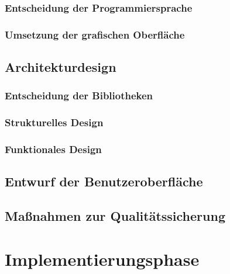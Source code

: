 \documentclass[ngerman,11pt,a4paper,titlepage]{article}
\begin{document}
	\subsubsection{Entscheidung der Programmiersprache}
	\label{subsubsec:programmiersprache}
	\programmierspracheText
	
	\subsubsection{Umsetzung der grafischen Oberfläche}
	\label{subsubsec:grafischeoberflaeche}
	\grafischeOberflaecheText
	
	\subsection{Architekturdesign}
	\label{subsec:architekturdesign}
	\architekturdesignText
	
	\subsubsection{Entscheidung der Bibliotheken}
	\label{subsubsec:bibliotheken}
	\bibliothekenText
	
	\subsubsection{Strukturelles Design}
	\label{subsubsec:strukturellesdesign}
	\strukturellesDesignText
	
	\subsubsection{Funktionales Design}
	\label{subsubsec:funktionalesdesign}
	\funktionalesDesignText
	
	\subsection{Entwurf der Benutzeroberfläche}
	\label{subsec:entwurfbenuzteroberflaeche}
	\entwurfbenuzteroberflaecheText
	
	\subsection{Maßnahmen zur Qualitätssicherung}
	\label{subsec:massnahmenqualitaetssicherung}
	\massnahmenQualitaetssicherungText
		
	\section{Implementierungsphase}
	\label{sec:implementierungsphase}
	\implementierungproviderText
	
\end{document}
